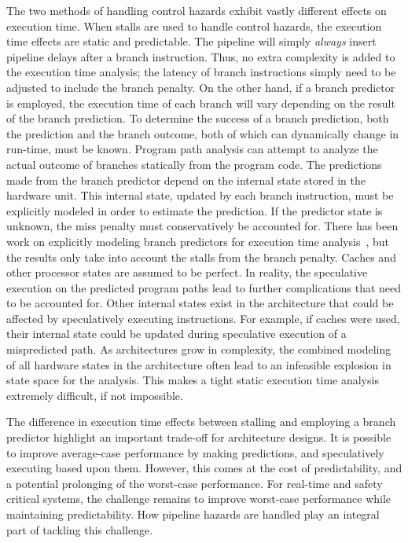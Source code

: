 The two methods of handling control hazards exhibit vastly different effects on execution time.    
When stalls are used to handle control hazards, the execution time effects are static and predictable.   
The pipeline will simply \emph{always} insert pipeline delays after a branch instruction.
Thus, no extra complexity is added to the execution time analysis; the latency of branch instructions simply need to be adjusted to include the branch penalty.
On the other hand, if a branch predictor is employed, the execution time of each branch will vary depending on the result of the branch prediction.  
To determine the success of a branch prediction, both the prediction and the branch outcome, both of which can dynamically change in run-time, must be known.   
Program path analysis can attempt to analyze the actual outcome of branches statically from the program code. 
The predictions made from the branch predictor depend on the internal state stored in the hardware unit.
This internal state, updated by each branch instruction, must be explicitly modeled in order to estimate the prediction. 
If the predictor state is unknown, the miss penalty must conservatively be accounted for.
There has been work on explicitly modeling branch predictors for execution time analysis~\cite{Mitra_branch_wcet_2002}, but the results only take into account the stalls from the branch penalty. 
Caches and other processor states are assumed to be perfect. 
In reality, the speculative execution on the predicted program paths lead to further complications that need to be accounted for.
Other internal states exist in the architecture that could be affected by speculatively executing instructions.
For example, if caches were used, their internal state could be updated during speculative execution of a mispredicted path.
As architectures grow in complexity, the combined modeling of all hardware states in the architecture often lead to an infeasible explosion in state space for the analysis.    
This makes a tight static execution time analysis extremely difficult, if not impossible.

The difference in execution time effects between stalling and employing a branch predictor highlight an important trade-off for architecture designs.    
It is possible to improve average-case performance by making predictions, and speculatively executing based upon them.
However, this comes at the cost of predictability, and a potential prolonging of the worst-case performance.  
For real-time and safety critical systems, the challenge remains to improve worst-case performance while maintaining predictability.
How pipeline hazards are handled play an integral part of tackling this challenge.           
 
